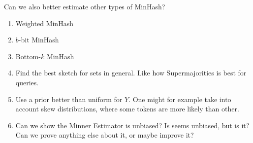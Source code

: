 Can we also better estimate other types of MinHash?
\begin{enumerate}
   \item Weighted MinHash
   \item $b$-bit MinHash
   \item Bottom-$k$ MinHash
   \item Find the best sketch for sets in general. Like how Supermajorities is best for queries.
   \item Use a prior better than uniform for $Y$.
      One might for example take into account skew distributions, where some tokens are more likely than other.
   \item Can we show the Minner Estimator is unbiased? Is seems unbiased, but is it?
      Can we prove anything else about it, or maybe improve it?
\end{enumerate}


